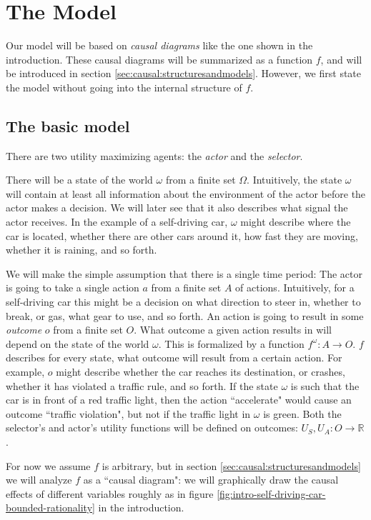 
\section{The Model}\label{sec:model}

Our model will be based on \textit{causal diagrams} like the one shown in the introduction. These causal diagrams will be summarized as a function $f$, and will be introduced in section \ref{sec:causal:structuresandmodels}. However, we first state the model without going into the internal structure of $f$.

\subsection{The basic model}\label{sec:model:singlesignalsingleaction}
There are two utility maximizing agents: the \textit{actor} and the \textit{selector}.

There will be a state of the world $\omega$ from a finite set $\Omega$. Intuitively, the state $\omega$ will contain at least all information about the environment of the actor before the actor makes a decision. We will later see that it also describes what signal the actor receives. In the example of a self-driving car, $\omega$ might describe where the car is located, whether there are other cars around it, how fast they are moving, whether it is raining, and so forth. 

We will make the simple assumption that there is a single time period: The actor is going to take a single action $a$ from a finite set $A$ of actions. Intuitively, for a self-driving car this might be a decision on what direction to steer in, whether to break, or gas, what gear to use, and so forth. An action is going to result in some \textit{outcome} $o$ from a finite set $O$.  What outcome a given action results in will depend on the state of the world $\omega$. This is formalized by a function $f^\omega\colon A \to O$. $f$ describes for every state, what outcome will result from a certain action. For example, $o$ might describe whether the car reaches its destination, or crashes, whether it has violated a traffic rule, and so forth. If the state $\omega$ is such that the car is in front of a red traffic light, then the action ``accelerate" would cause an outcome ``traffic violation", but not if the traffic light in $\omega$ is green. Both the selector's and actor's utility functions will be defined on outcomes: $U_S,U_A\colon O\to\mathbb R$.

For now we assume $f$ is arbitrary, but in section \ref{sec:causal:structuresandmodels} we will analyze $f$ as a ``causal diagram": we will graphically draw the causal effects of different variables roughly as in figure \ref{fig:intro-self-driving-car-bounded-rationality} in the introduction. 

